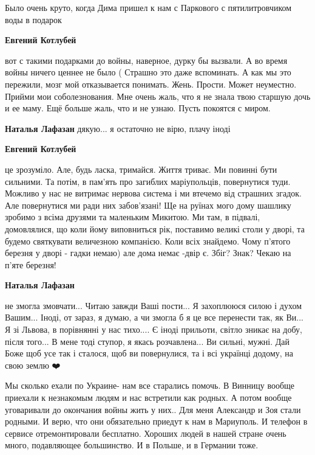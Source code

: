 
Было очень круто, когда Дима пришел к нам с Паркового с пятилитровчиком воды в
подарок

\begin{itemize} %
\textbf{Евгений Котлубей} 

вот с такими подарками до войны, наверное, дурку бы вызвали. А во время войны
ничего ценнее не было ( Страшно это даже вспоминать. А как мы это пережили,
мозг мой отказывается понимать. Жень. Прости. Может неуместно. Прийми мои
соболезнования. Мне очень жаль, что я не знала твою старшую дочь и ее маму. Ещё
больше жаль, что и не узнаю. Пусть покоятся с миром.

\textbf{Наталья Лафазан} дякую... я остаточно не вірю, плачу іноді

\textbf{Евгений Котлубей} 

це зрозуміло. Але, будь ласка, тримайся. Життя триває. Ми повинні бути
сильними. Та потім, в пам'ять про загиблих маріупольців, повернутися туди.
Можливо у нас не витримає нервова система і ми втечемо від страшних згадок. Але
повернутися ми ради них забов'язані! Ще на руїнах мого дому шашлику зробимо з
всіма друзями та маленьким Микитою. Ми там, в підвалі, домовлялися, що коли
йому виповниться рік, поставимо великі столи у дворі, та будемо святкувати
величезною компанією. Коли всіх знайдемо. Чому п'ятого березня у дворі - гадки
немаю) але дома немає -двір є. Збіг? Знак? Чекаю на п'яте березня!

\textbf{Наталья Лафазан} 

не змогла змовчати... Читаю завжди Ваші пости... Я захоплююся силою і духом
Вашим... Іноді, от зараз, я думаю, а чи змогла б я це все перенести так, як
Ви... Я зі Львова, в порівнянні у нас тихо.... Є іноді прильоти, світло зникає
на добу, після того... В мене тоді ступор, я якась розчавлена... Ви сильні,
мужні. Дай Боже щоб усе так і сталося, щоб ви повернулися, та і всі українці
додому, на свою землю ❤️🙏🙏🙏

\end{itemize} %


Мы сколько ехали по Украине- нам все старались помочь. В Винницу вообще
приехали к незнакомым людям и нас встретили как родных. А потом вообще
уговаривали до окончания войны жить у них.. Для меня Александр и Зоя стали
родными. И верю, что они обязательно приедут к нам в Мариуполь. И телефон в
сервисе отремонтировали бесплатно. Хороших людей в нашей стране очень много,
подавляющее большинство. И в Польше, и в Германии тоже.


